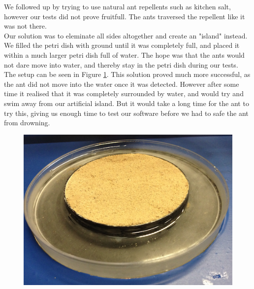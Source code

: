 We followed up by trying to use natural ant repellents such as kitchen salt, however our tests did not prove fruitfull. The ants traversed the repellent like it was not there.\\

Our solution was to eleminate all sides altogether and create an "island" instead. We filled the petri dish with ground until it was completely full, and placed it within a much larger petri dish full of water. The hope was that the ants would not dare move into water, and thereby stay in the petri dish during our tests. The setup can be seen in Figure \ref{fig:petridish}. This solution proved much more successful, as the ant did not move into the water once it was detected. However after some time it realised that it was completely surrounded by water, and would try and swim away from our artificial island. But it would take a long time for the ant to try this, giving us enough time to test our software before we had to safe the ant from drowning.\\

\begin{figure}[ht!]
  \centering
    \includegraphics[scale=0.25]{img/petridish}
  \caption{}
  \label{fig:petridish}
\end{figure}